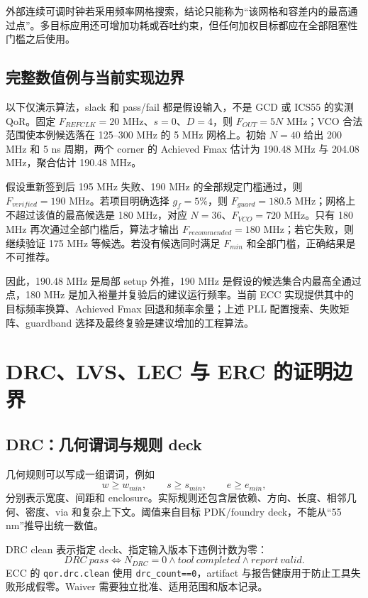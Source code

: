 \documentclass[UTF8,a4paper,11pt,fontset=fandol]{ctexart}
\numberwithin{equation}{section}
\newcommand{\code}[1]{\nolinkurl{#1}}
\begin{document}
外部连续可调时钟若采用频率网格搜索，结论只能称为“该网格和容差内的最高通过点”。多目标应用还可增加功耗或吞吐约束，但任何加权目标都应在全部阻塞性门槛之后使用。

\subsection{完整数值例与当前实现边界}

以下仅演示算法，slack 和 pass/fail 都是假设输入，不是 GCD 或 ICS55 的实测 QoR。固定 $F_{REFCLK}=20$ MHz、$s=0$、$D=4$，则 $F_{OUT}=5N$ MHz；VCO 合法范围使本例候选落在 125--300 MHz 的 5 MHz 网格上。初始 $N=40$ 给出 200 MHz 和 5 ns 周期，两个 corner 的 Achieved Fmax 估计为 190.48 MHz 与 204.08 MHz，聚合估计 190.48 MHz。

假设重新签到后 195 MHz 失败、190 MHz 的全部规定门槛通过，则 $F_{verified}=190$ MHz。若项目明确选择 $g_f=5\%$，则 $F_{guard}=180.5$ MHz；网格上不超过该值的最高候选是 180 MHz，对应 $N=36$、$F_{VCO}=720$ MHz。只有 180 MHz 再次通过全部门槛后，算法才输出 $F_{recommended}=180$ MHz；若它失败，则继续验证 175 MHz 等候选。若没有候选同时满足 $F_{min}$ 和全部门槛，正确结果是不可推荐。

因此，190.48 MHz 是局部 setup 外推，190 MHz 是假设的候选集合内最高全通过点，180 MHz 是加入裕量并复验后的建议运行频率。当前 ECC 实现提供其中的目标频率换算、Achieved Fmax 回退和频率余量；上述 PLL 配置搜索、失败矩阵、guardband 选择及最终复验是建议增加的工程算法。

\section{DRC、LVS、LEC 与 ERC 的证明边界}

\subsection{DRC：几何谓词与规则 deck}

几何规则可以写成一组谓词，例如
\begin{equation}
w\ge w_{min},\qquad s\ge s_{min},\qquad e\ge e_{min},
\end{equation}
分别表示宽度、间距和 enclosure。实际规则还包含层依赖、方向、长度、相邻几何、密度、via 和复杂上下文。阈值来自目标 PDK/foundry deck，不能从“55 nm”推导出统一数值。

DRC clean 表示指定 deck、指定输入版本下违例计数为零：
\begin{equation}
DRC\ pass\Longleftrightarrow N_{DRC}=0
\land tool\ completed\land report\ valid.
\end{equation}
ECC 的 \code{qor.drc.clean} 使用 \code{drc_count==0}，artifact 与报告健康用于防止工具失败形成假零。Waiver 需要独立批准、适用范围和版本记录。
\end{document}
